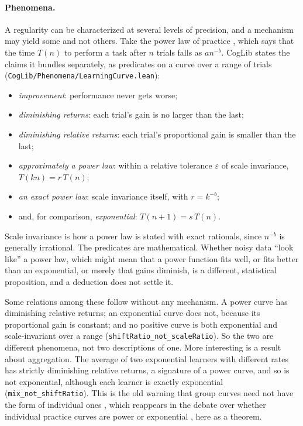 \documentclass[11pt]{article}
\newcommand{\code}[1]{\texttt{#1}}
\newcommand{\lean}[1]{\texttt{#1}}
\begin{document}
\paragraph{Phenomena.} A regularity can be characterized at several levels of precision, and a mechanism may yield some and not others. Take the power law of practice \citep{newell1981}, which says that the time $T(n)$ to perform a task after $n$ trials falls as $a n^{-b}$. CogLib states the claims it bundles separately, as predicates on a curve over a range of trials (\code{CogLib/Phenomena/LearningCurve.lean}):
\begin{itemize}
  \item \emph{improvement}: performance never gets worse;
  \item \emph{diminishing returns}: each trial's gain is no larger than the last;
  \item \emph{diminishing relative returns}: each trial's proportional gain is smaller than the last;
  \item \emph{approximately a power law}: within a relative tolerance $\varepsilon$ of scale invariance, $T(kn) = r\,T(n)$;
  \item \emph{an exact power law}: scale invariance itself, with $r = k^{-b}$;
  \item and, for comparison, \emph{exponential}: $T(n+1) = s\,T(n)$.
\end{itemize}
Scale invariance is how a power law is stated with exact rationals, since $n^{-b}$ is generally irrational. The predicates are mathematical. Whether noisy data ``look like'' a power law, which might mean that a power function fits well, or fits better than an exponential, or merely that gains diminish, is a different, statistical proposition, and a deduction does not settle it.

Some relations among these follow without any mechanism. A power curve has diminishing relative returns; an exponential curve does not, because its proportional gain is constant; and no positive curve is both exponential and scale-invariant over a range (\lean{shiftRatio\_not\_scaleRatio}). So the two are different phenomena, not two descriptions of one. More interesting is a result about aggregation. The average of two exponential learners with different rates has strictly diminishing relative returns, a signature of a power curve, and so is not exponential, although each learner is exactly exponential (\lean{mix\_not\_shiftRatio}). This is the old warning that group curves need not have the form of individual ones \citep{estes1956}, which reappears in the debate over whether individual practice curves are power or exponential \citep{heathcote2000}, here as a theorem.
\end{document}
